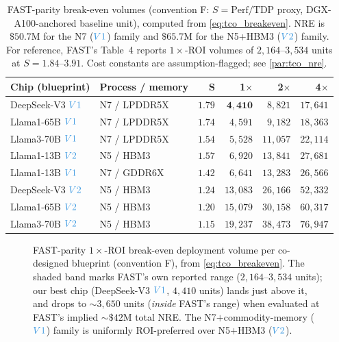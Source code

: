 \begin{table}[t]
\centering
\small
\caption{FAST-parity break-even volumes (convention F: $S=\text{Perf/TDP}$
proxy, DGX-A100-anchored baseline unit), computed from
\cref{eq:tco_breakeven}. NRE is $\$50.7\mathrm{M}$ for the N7 ($\Vone$) family
and $\$65.7\mathrm{M}$ for the N5+HBM3 ($\Vtwo$) family. For reference, FAST's
Table~4 reports $1\times$-ROI volumes of $2{,}164\text{--}3{,}534$ units at
$S=1.84\text{--}3.91$. Cost constants are assumption-flagged; see
\cref{par:tco_nre}.}
\label{tab:tco_breakeven}
\begin{tabular}{@{}llrrrr@{}}
\toprule
\textbf{Chip (blueprint)} & \textbf{Process / memory} & $\mathbf{S}$ &
\textbf{1$\times$} & \textbf{2$\times$} & \textbf{4$\times$} \\
\midrule
DeepSeek-V3 $\Vone$ & N7 / LPDDR5X & $1.79$ & $\mathbf{4{,}410}$ & $8{,}821$ & $17{,}641$ \\
Llama1-65B $\Vone$  & N7 / LPDDR5X & $1.74$ & $4{,}591$ & $9{,}182$ & $18{,}363$ \\
Llama3-70B $\Vone$  & N7 / LPDDR5X & $1.54$ & $5{,}528$ & $11{,}057$ & $22{,}114$ \\
Llama1-13B $\Vtwo$  & N5 / HBM3    & $1.57$ & $6{,}920$ & $13{,}841$ & $27{,}681$ \\
Llama1-13B $\Vone$  & N7 / GDDR6X  & $1.42$ & $6{,}641$ & $13{,}283$ & $26{,}566$ \\
DeepSeek-V3 $\Vtwo$ & N5 / HBM3    & $1.24$ & $13{,}083$ & $26{,}166$ & $52{,}332$ \\
Llama1-65B $\Vtwo$  & N5 / HBM3    & $1.20$ & $15{,}079$ & $30{,}158$ & $60{,}317$ \\
Llama3-70B $\Vtwo$  & N5 / HBM3    & $1.15$ & $19{,}237$ & $38{,}473$ & $76{,}947$ \\
\bottomrule
\end{tabular}
\end{table}

\begin{figure}[t]
\centering
\caption{FAST-parity $1\times$-ROI break-even deployment volume per co-designed
blueprint (convention F), from \cref{eq:tco_breakeven}. The shaded band marks
FAST's own reported range ($2{,}164\text{--}3{,}534$ units); our best chip
(DeepSeek-V3 $\Vone$, $4{,}410$ units) lands just above it, and drops to
${\sim}3{,}650$ units (\emph{inside} FAST's range) when evaluated at FAST's
implied ${\sim}\$42\mathrm{M}$ total NRE. The N7$+$commodity-memory ($\Vone$)
family is uniformly ROI-preferred over N5$+$HBM3 ($\Vtwo$).}
\label{fig:tco_breakeven}
\end{figure}

